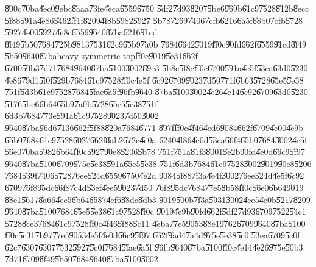 \documentclass[12pt,a4paper]{article}
\begin{document}
\U{800c}\U{70ba}\U{4ec0}\U{9ebc}\U{8aaa}\U{73fe}\U{4eca}\U{6559}\U{6750}%
\U{5df2}\U{7d93}\U{8207}\U{5be6}\U{969b}\U{61c9}\U{7528}\U{812b}\U{8ecc}%
\U{5f88}\U{591a}\U{4e86}\U{5462}\U{ff1f}\U{8209}\U{4f8b}\U{5982}\U{5927}%
\U{5b78}\U{7269}\U{7406}\U{7cfb}\U{6216}\U{6a5f}\U{68b0}\U{7cfb}\U{5728}%
\U{5927}\U{4e00}\U{5927}\U{4e8c}\U{6559}\U{9640}\U{87ba}\U{6216}\U{91cd}%
\U{8f49}\U{5b50}\U{7684}\U{725b}\U{9813}\U{7531}\U{62c9}\U{65b9}\U{7a0b}%
\U{7684}\U{6642}\U{5019}\U{ff0c}\U{90fd}\U{662f}\U{6559}\U{91cd}\U{8f49}%
\U{5b50}\U{9640}\U{87ba}heavy symmetric top\U{ff0c}\U{9019}\U{5c31}\U{662f}%
\U{6700}\U{50b3}\U{7d71}\U{7684}\U{9640}\U{87ba}\U{5100}\U{3002}\U{89e3}%
\U{5b8c}\U{5f8c}\U{ff0c}\U{6700}\U{591a}\U{4e5f}\U{53ea}\U{63d0}\U{5230}%
\U{4e86}\U{79d1}\U{5f0f}\U{529b}\U{7684}\U{61c9}\U{7528}\U{ff0c}\U{4e5f}%
\U{6c92}\U{6709}\U{9023}\U{7d50}\U{771f}\U{6b63}\U{5728}\U{65e5}\U{5e38}%
\U{751f}\U{6d3b}\U{61c9}\U{7528}\U{7684}\U{5fae}\U{6a5f}\U{96fb}\U{9640}%
\U{87ba}\U{5100}\U{3002}\U{4e26}\U{4e14}\U{6c92}\U{6709}\U{63d0}\U{5230}%
\U{5176}\U{5be6}\U{6b64}\U{65b9}\U{7a0b}\U{5728}\U{65e5}\U{5e38}\U{751f}%
\U{6d3b}\U{7684}\U{773e}\U{591a}\U{61c9}\U{7528}\U{9023}\U{7d50}\U{3002}%
\U{9640}\U{87ba}\U{96d6}\U{7136}\U{662f}\U{5f88}\U{820a}\U{7684}\U{6771}%
\U{897f}\U{ff0c}\U{4f46}\U{4ed6}\U{9084}\U{662f}\U{6709}\U{4e00}\U{4e9b}%
\U{65b0}\U{7684}\U{61c9}\U{7528}\U{6027}\U{662f}\U{8ab2}\U{672c}\U{4e0a}%
\U{6240}\U{4f86}\U{4e0d}\U{53ca}\U{66f4}\U{65b0}\U{7684}\U{3002}\U{4e5f}%
\U{56e0}\U{70ba}\U{5982}\U{6b64}\U{ff0c}\U{5927}\U{90e8}\U{5206}\U{5b78}%
\U{751f}\U{751a}\U{81f3}\U{8001}\U{5e2b}\U{90fd}\U{4e0d}\U{66c9}\U{5f97}%
\U{9640}\U{87ba}\U{5100}\U{6709}\U{975e}\U{5e38}\U{591a}\U{65e5}\U{5e38}%
\U{751f}\U{6d3b}\U{7684}\U{61c9}\U{7528}\U{3002}\U{9019}\U{90e8}\U{5206}%
\U{7684}\U{539f}\U{7406}\U{5728}\U{76ee}\U{524d}\U{6559}\U{6750}\U{4e2d}%
\U{9084}\U{5f88}\U{7f3a}\U{4e4f}\U{3002}\U{76ee}\U{524d}\U{4e5f}\U{6c92}%
\U{6709}\U{76f8}\U{95dc}\U{66f8}\U{7c4d}\U{53ef}\U{4ee5}\U{9023}\U{7d50}%
\U{76f8}\U{95dc}\U{7684}\U{77e5}\U{8b58}\U{ff0c}\U{56e0}\U{6b64}\U{9019}%
\U{88e1}\U{5617}\U{8a66}\U{4ee5}\U{6b64}\U{6587}\U{4ef6}\U{88dc}\U{8db3}%
\U{9019}\U{500b}\U{7f3a}\U{5931}\U{3002}\U{4ee5}\U{4e0b}\U{5217}\U{8209}%
\U{9640}\U{87ba}\U{5100}\U{7684}\U{65e5}\U{5e38}\U{61c9}\U{7528}\U{ff0c}%
\U{9019}\U{4e9b}\U{90fd}\U{662f}\U{5df2}\U{7d93}\U{6709}\U{7522}\U{54c1}%
\U{5728}\U{8ce3}\U{7684}\U{61c9}\U{7528}\U{ff0c}\U{4f46}\U{5f88}\U{5c11}%
\U{4eba}\U{77e5}\U{9053}\U{88e1}\U{9762}\U{6709}\U{9640}\U{87ba}\U{5100}%
\U{ff0c}\U{5c31}\U{7b97}\U{77e5}\U{9053}\U{4e5f}\U{4e0d}\U{66c9}\U{5f97}%
\U{662f}\U{9ad4}\U{7a4d}\U{975e}\U{5e38}\U{5c0f}\U{53ea}\U{6709}\U{5c0f}%
\U{62c7}\U{6307}\U{6307}\U{7532}\U{5927}\U{5c0f}\U{7684}\U{5fae}\U{6a5f}%
\U{96fb}\U{9640}\U{87ba}\U{5100}\U{ff0c}\U{4e14}\U{4e26}\U{975e}\U{50b3}%
\U{7d71}\U{6709}\U{8f49}\U{5b50}\U{7684}\U{9640}\U{87ba}\U{5100}\U{3002}
\end{document}
